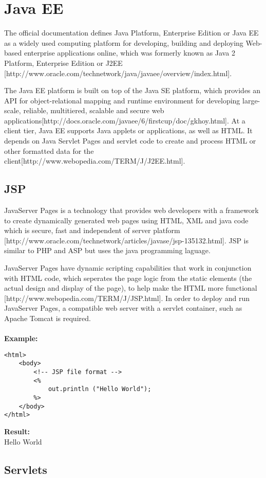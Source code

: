 \section{Java EE}
The official documentation defines Java Platform, Enterprise Edition or 
Java EE as a widely used computing platform for developing, building and 
deploying Web-based enterprise applications online, which was formerly known as Java 2 Platform, Enterprise Edition 
or J2EE [http://www.oracle.com/technetwork/java/javaee/overview/index.html].
\par
The Java EE platform is built on top of the Java SE platform, which provides
an API for object-relational mapping and runtime environment for developing
large-scale, reliable, multitiered, scalable and secure web applications[http://docs.oracle.com/javaee/6/firstcup/doc/gkhoy.html].
At a client tier, Java EE supports Java applets or applications, as well as
HTML. It depends on Java Servlet Pages and servlet code to create and process
HTML or other formatted data for the client[http://www.webopedia.com/TERM/J/J2EE.html].
\subsection{JSP}
JavaServer Pages is a technology that provides web developers with a framework to create dynamically generated web pages using HTML, XML and java code which is secure, fast and independent of server platform [http://www.oracle.com/technetwork/articles/javase/jsp-135132.html]. JSP
is similar to PHP and ASP but uses the java programming laguage.
\par
JavaServer Pages have dynamic scripting capabilities that work in conjunction with HTML code, which seperates the page logic from the static elements (the actual design and display of the page), to help make the HTML more functional
[http://www.webopedia.com/TERM/J/JSP.html]. In order to deploy and run JavaServer Pages, a compatible web server with a servlet container, such as Apache Tomcat is required.\\
\\
\textbf{Example:}
\begin{verbatim}
<html>
    <body>
        <!-- JSP file format -->
        <%
            out.println ("Hello World");
        %>
    </body>
</html>
\end{verbatim}
\textbf{Result:}\\
Hello World

\subsection{Servlets}


